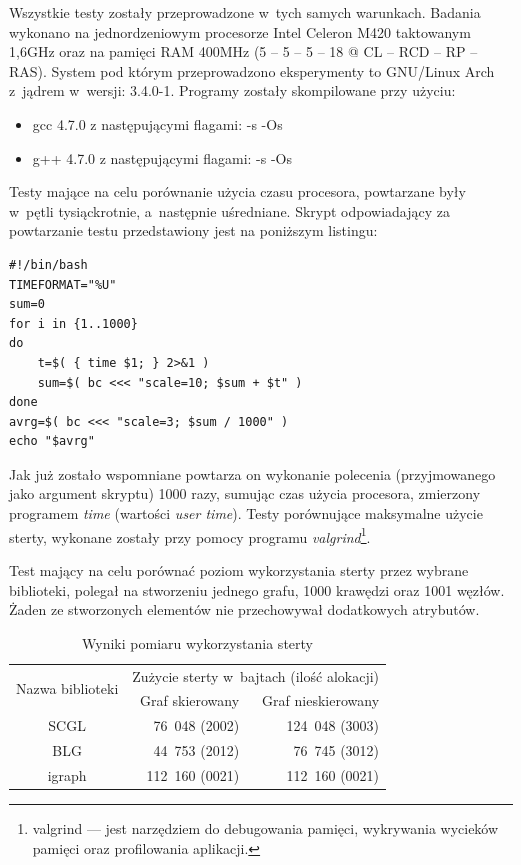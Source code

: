 \documentclass[a4paper,12pt,polish,oneside]{thesis}
\begin{document}
Wszystkie testy zostały przeprowadzone w~tych samych warunkach.
Badania wykonano na jednordzeniowym procesorze Intel Celeron M420 taktowanym 1,6GHz oraz na pamięci RAM 400MHz (5 -- 5 -- 5 -- 18 @ CL -- RCD -- RP -- RAS).
System pod którym przeprowadzono eksperymenty to GNU/Linux Arch z~jądrem w~wersji: 3.4.0-1.
Programy zostały skompilowane przy użyciu:
\begin{itemize}
	\item gcc 4.7.0 z następującymi flagami: -s -Os
	\item g++ 4.7.0 z następującymi flagami: -s -Os
\end{itemize}

Testy mające na celu porównanie użycia czasu procesora, powtarzane były w~pętli tysiąckrotnie, a~następnie uśredniane.
Skrypt odpowiadający za powtarzanie testu przedstawiony jest na poniższym listingu:
\begin{lstlisting}[style=code]
#!/bin/bash
TIMEFORMAT="%U"
sum=0
for i in {1..1000}
do
	t=$( { time $1; } 2>&1 )
	sum=$( bc <<< "scale=10; $sum + $t" )
done
avrg=$( bc <<< "scale=3; $sum / 1000" )
echo "$avrg"
\end{lstlisting}
Jak już zostało wspomniane powtarza on wykonanie polecenia (przyjmowanego jako argument skryptu) 1000 razy, sumując czas użycia procesora, zmierzony programem \emph{time} (wartości \emph{user time}).
Testy porównujące maksymalne użycie sterty, wykonane zostały przy pomocy programu \emph{valgrind}\footnote{valgrind --- jest narzędziem do debugowania pamięci, wykrywania wycieków pamięci oraz profilowania aplikacji.}.

Test mający na celu porównać poziom wykorzystania sterty przez wybrane biblioteki, polegał na stworzeniu jednego grafu, 1000 krawędzi oraz 1001 węzłów.
Żaden ze stworzonych elementów nie przechowywał dodatkowych atrybutów.
\begin{table}[htb]
\caption{Wyniki pomiaru wykorzystania sterty}
\label{tab:mem_size}
\centering
\begin{tabular}{ | c | r | r | }
	\hline
	\multirow{2}{*}{Nazwa biblioteki } & \multicolumn{2}{|c|}{Zużycie sterty w~bajtach (ilość alokacji)} \\
	\cline{2-3}
		& Graf skierowany & Graf nieskierowany \\
	\hline \hline
	SCGL    & 76~048  (2002) & 124~048 (3003) \\ \hline
	BLG     & 44~753  (2012) &  76~745 (3012) \\ \hline
	igraph  & 112~160 (0021) & 112~160 (0021) \\ \hline
\end{tabular}
\end{table}
\end{document}
